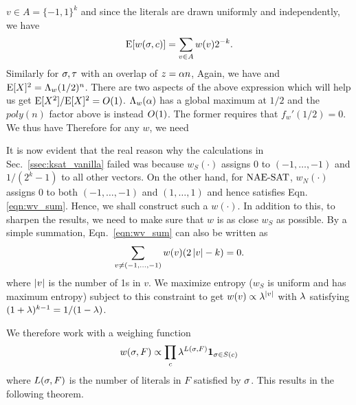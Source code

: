 \documentclass[letterpaper, 10pt, twocolumn, reqno]{amsart}
\begin{document}
$v \in A = \{-1,1\}^k$ and since the literals are drawn uniformly and independently, we have
$$
\textrm{E}[w(\sigma,c)] = \sum_{v \in A} w(v) 2^{-k}.
$$
Similarly for $\sigma, \tau$ with an overlap of $z =\alpha n$,
Again, we have
and $\textrm{E}[X]^2 = \Lambda_w(1/2)^n$. There are two aspects of the above expression which will help us get $\textrm{E}[X^2]/\textrm{E}[X]^2 = O(1)$. $\Lambda_w(\alpha)$ has a global maximum at $1/2$ and the $poly(n)$ factor above is instead $O(1)$. The former requires that $f_w'(1/2) =0$. We thus have
Therefore for any $w$, we need

It is now evident that the real reason why the calculations in Sec.~\ref{ssec:ksat_vanilla} failed was because $w_S(\cdot)$ assigns 0 to $(-1,\ldots,-1)$
and $1/(2^k-1)$ to all other vectors. On the other hand, for $\textrm{NAE-SAT}$, $w_N(\cdot)$ assigns 0 to both $(-1,\ldots,-1)$ and $(1,\ldots,1)$ and hence satisfies Eqn.~
\eqref{eqn:wv_sum}. Hence, we shall construct such a $w(\cdot)$. In addition to this, to sharpen the results, we need to make sure that $w$ is as close $w_S
$ as possible. By a simple summation, Eqn.~\eqref{eqn:wv_sum} can also be written as
$$
\sum_{v \neq (-1,\ldots,-1)} w(v) (2\left| v \right| - k) = 0.
$$
where $\left| v \right|$ is the number of 1s in $v$. We maximize entropy ($w_S$ is uniform and has maximum entropy) subject to this constraint to get $w(v) \propto \lambda^{\left| v \right|}$ with $\lambda$ satisfying $(1+\lambda)^{k-1} = 1/(1-\lambda)$.

We therefore work with a weighing function
$$
w(\sigma,F) \propto \prod_c \lambda^{L(\sigma,F)} {\bf 1}_{\sigma \in S(c)}
$$
where $L(\sigma,F)$ is the number of literals in $F$ satisfied by $\sigma$. This results in the following theorem.
\end{document}
